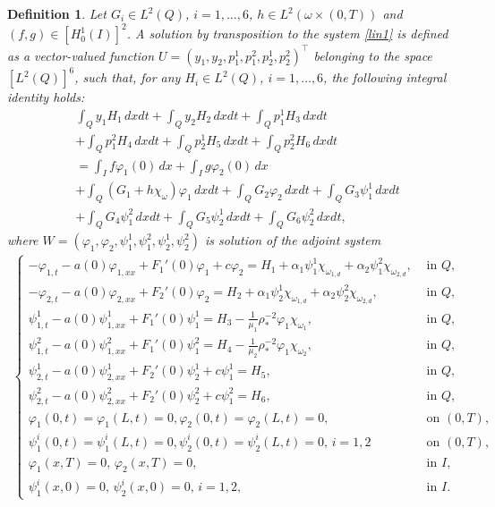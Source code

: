 \documentclass[11pt,a4paper]{amsart}
\numberwithin{equation}{section}
\newtheorem{definition}{Definition}[section]
\begin{document}
\begin{definition}
Let $G_i \in L^2(Q)$, $i=1, \ldots, 6$, $h \in L^2(\omega\times (0,T))$ and $(f, g) \in  [H_0^1(I)]^2$.  A solution by transposition to the system \eqref{lin1} is defined as a vector-valued function $U= \left (y_1,  y_2,  p_1^1,  p_1^2,  p_2^1, p_2^2\right)^{\top}$ belonging to the space $[L^2(Q)]^6$, such that, for any $H_i \in L^2(Q)$, $i=1, \ldots, 6$,  the following integral identity holds:
\begin{equation}\label{transposition_identity}
\begin{split}
&\int_{Q}y_{1}H_{1}\,dxdt+\int_{Q}y_{2}H_{2}\,dxdt+\int_{Q}p^1_{1}H_{3}\,dxdt\\
&+\int_{Q}p^2_{1}H_{4}\,dxdt+\int_{Q}p^1_{2}H_{5}\,dxdt+\int_{Q}p^2_{2}H_{6}\,dxdt\\
&=\int_{I}f\varphi_{1}(0)\,dx+\int_{I}g\varphi_{2}(0)\,dx\\
&+\int_{Q}\left(G_{1}+h\chi_{\omega}\right)\varphi_{1}\,dxdt+\int_{Q}G_{2}\varphi_{2}\,dxdt+\int_{Q}G_{3}\psi^{1}_{1}\,dxdt\\
&+\int_{Q}G_{4}\psi^{2}_{1}\,dxdt+\int_{Q}G_{5}\psi^{1}_{2}\,dxdt+\int_{Q}G_{6}\psi^{2}_{2}\,dxdt,
\end{split}
\end{equation}where $W=(\varphi_{1},\varphi_{2},\psi^{1}_{1},\psi^{2}_{1},\psi^{1}_{2},\psi^{2}_{2})$ is solution of the adjoint system
\begin{align} \label{ad3333}
		\begin{cases}
			-\varphi_{1,t}-a(0)\varphi_{1,xx}+F_1'(0)\varphi_1+c\varphi_2   = H_1+\alpha_1\psi_1^1\chi_{\omega_{1,d}} +\alpha_2\psi_1^2\chi_{\omega_{2,d}},&\text{ in } Q,\\
			-\varphi_{2,t}-a(0)\varphi_{2,xx}+F_2'(0)\varphi_2  = H_2+\alpha_1\psi_2^1\chi_{\omega_{1,d}} +\alpha_2\psi_2^2\chi_{\omega_{2,d}},&\text{ in } Q,\\
			\psi_{1,t}^1-a(0)\psi_{1,xx}^1+F_1'(0)\psi_1^1=H_3-\frac{1}{\mu_1}\rho_*^{-2}\varphi_1\chi_{\omega_1},&\text{ in } Q, \\
			\psi_{1,t}^2-a(0)\psi_{1,xx}^2+F_1'(0)\psi_1^2=H_4-\frac{1}{\mu_2}\rho_*^{-2}\varphi_1\chi_{\omega_2},&\text{ in } Q,\\
			\psi_{2,t}^1-a(0)\psi_{2,xx}^1+F_2'(0)\psi_2^1+c\psi_1^1=H_5, &\text{ in } Q,\\
			\psi_{2,t}^2-a(0)\psi_{2,xx}^2+F_2'(0)\psi_2^2+c\psi_1^2=H_6, &\text{ in } Q,\\
   			\varphi_1(0,t) = \varphi_1(L,t) =0, \varphi_2(0,t) = \varphi_2(L,t) = 0, &\text{ on } (0,T),\\
			\psi_1^i(0,t) = \psi_1^i(L,t) =0, \psi_2^i(0,t) = \psi_2^i(L,t) = 0,\, i=1,2&\text{ on } (0,T),\\
			\varphi_1(x,T) =0, \, \varphi_2(x,T) =0,&\text{ in } I,\\
			\psi_1^i(x,0) = 0, \, \psi_2^i(x,0) = 0, \, i=1,2,&\text{ in } I. 
		\end{cases}		
	\end{align}
\end{definition}
\end{document}
